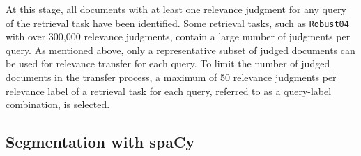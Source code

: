 \\\\\\\\\\
At this stage, all documents with at least one relevance judgment for any query of the retrieval task have been identified. Some retrieval tasks, such as \texttt{Robust04} with over 300,000 relevance judgments, contain a large number of judgments per query. As mentioned above, only a representative subset of judged documents can be used for relevance transfer for each query. To limit the number of judged documents in the transfer process, a maximum of 50 relevance judgments per relevance label of a retrieval task for each query, referred to as a query-label combination, is selected.

\subsection{Segmentation with spaCy}\label{segmentation-with-spacy}

